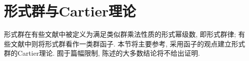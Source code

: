 \section{形式群与Cartier理论}

形式群在有些文献中被定义为满足类似群乘法性质的形式幂级数, 即形式群律;
有些文献中则将形式群看作一类群函子. 
本节将主要参考\cite{Zi84}, 采用函子的观点建立形式群的Cartier理论.
囿于篇幅限制, 陈述的大多数结论将不给出证明.

